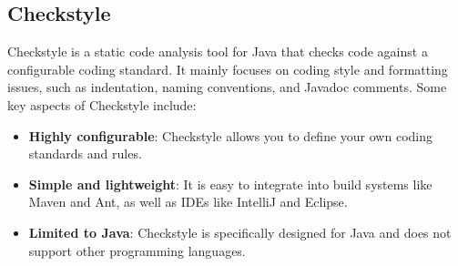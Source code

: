 \subsection{Checkstyle}\label{subsec:checkstyle}
Checkstyle is a static code analysis tool for Java that checks code against a configurable coding standard.
It mainly focuses on coding style and formatting issues, such as indentation, naming conventions, and Javadoc comments.\cite{checkstyle-docs}
Some key aspects of Checkstyle include:

\begin{itemize}
    \item\textbf{Highly configurable}: Checkstyle allows you to define your own coding standards and rules.
    \item\textbf{Simple and lightweight}: It is easy to integrate into build systems like Maven and Ant, as well as IDEs like IntelliJ and Eclipse.
    \item\textbf{Limited to Java}: Checkstyle is specifically designed for Java and does not support other programming languages.
\end{itemize}

